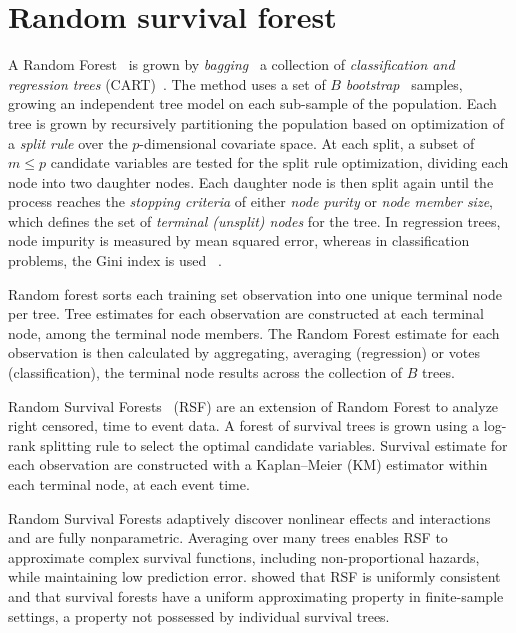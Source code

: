 \documentclass[nojss]{jss}
\begin{document}
\section{Random survival forest}\label{S:rfsrc}

A Random Forest~\citep{Breiman:2001} is grown by \emph{bagging}~\citep{Breiman:1996} a collection of \emph{classification and regression trees} (CART)~\citep{cart:1984}. The method uses a set of $B$ \emph{bootstrap}~\citep{bootstrap:1994} samples, growing an independent tree model on each sub-sample of the population. Each tree is grown by recursively partitioning the population based on optimization of a \emph{split rule} over the $p$-dimensional covariate space. At each split, a subset of $m \le p$ candidate variables are tested for the split rule optimization, dividing each node into two daughter nodes. Each daughter node is then split again until the process reaches the \emph{stopping criteria} of either \emph{node purity} or \emph{node member size}, which defines the set of \emph{terminal (unsplit) nodes} for the tree. In regression trees, node impurity is measured by mean squared error, whereas in classification problems, the Gini index is used~\citep{Friedman:2000} .

Random forest sorts each training set observation into one unique terminal node per tree. Tree estimates for each observation are constructed at each terminal node, among the terminal node members. The Random Forest estimate for each observation is then calculated by aggregating, averaging (regression) or votes (classification), the terminal node results across the collection of $B$ trees.

Random Survival Forests~\citep{Ishwaran:2007, Ishwaran:2008} (RSF) are an extension of Random Forest to analyze right censored, time to event data. A forest of survival trees is grown using a log-rank splitting rule to select the optimal candidate variables. Survival estimate for each observation are constructed with a Kaplan--Meier (KM) estimator within each terminal node, at each event time.

Random Survival Forests adaptively discover nonlinear effects and interactions and are fully nonparametric. Averaging over many trees enables RSF to approximate complex survival functions, including non-proportional hazards, while maintaining low prediction error. \cite{Ishwaran:2010a} showed that RSF is uniformly consistent and that survival forests have a uniform approximating property in finite-sample settings, a property not possessed by individual survival trees.
\end{document}
